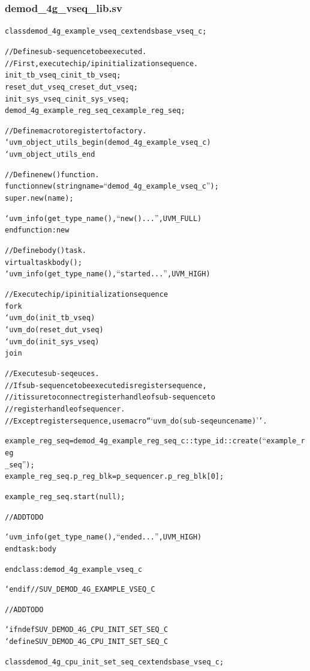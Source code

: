 \documentclass{note}
\begin{document}
\subsubsection{demod\_4g\_vseq\_lib.sv}
\begin{alltt}
class demod_4g_example_vseq_c extends base_vseq_c;

   // Define sub-sequence to be executed.
   // First, execute chip/ip initialization sequence.
   init_tb_vseq_c init_tb_vseq;
   reset_dut_vseq_c reset_dut_vseq;
   init_sys_vseq_c init_sys_vseq;
   demod_4g_example_reg_seq_c example_reg_seq;

   // Define macro to register to factory.
   `uvm_object_utils_begin(demod_4g_example_vseq_c)
   `uvm_object_utils_end

   // Define new() function.
   function new(string name = ``demod_4g_example_vseq_c'');
      super.new(name);

      `uvm_info(get_type_name(), ``new() ...'', UVM_FULL)
   endfunction: new

   // Define body() task.
   virtual task body();
      `uvm_info(get_type_name(), ``started ...'', UVM_HIGH)

      // Execute chip/ip initialization sequence
      fork
         `uvm_do(init_tb_vseq)
         `uvm_do(reset_dut_vseq)
         `uvm_do(init_sys_vseq)
      join

      // Execute sub-seqeuces.
      // If sub-sequence to be executed is register sequence,
      // it is sure to connect register handle of sub-sequence to
      // register handle of sequencer.
      // Except register sequence, use macro ```uvm_do(sub-seqeunce name)''.

      example_reg_seq = demod_4g_example_reg_seq_c::type_id::create(``example_reg
_seq'');
      example_reg_seq.p_reg_blk = p_sequencer.p_reg_blk[0];

      example_reg_seq.start(null);

      // ADD TO DO

      `uvm_info(get_type_name(), ``ended ...'', UVM_HIGH)
   endtask: body

endclass: demod_4g_example_vseq_c

`endif // SUV_DEMOD_4G_EXAMPLE_VSEQ_C

// ADD TO DO

`ifndef SUV_DEMOD_4G_CPU_INIT_SET_SEQ_C
`define SUV_DEMOD_4G_CPU_INIT_SET_SEQ_C

class demod_4g_cpu_init_set_seq_c extends base_vseq_c;


\end{alltt}
\end{document}
